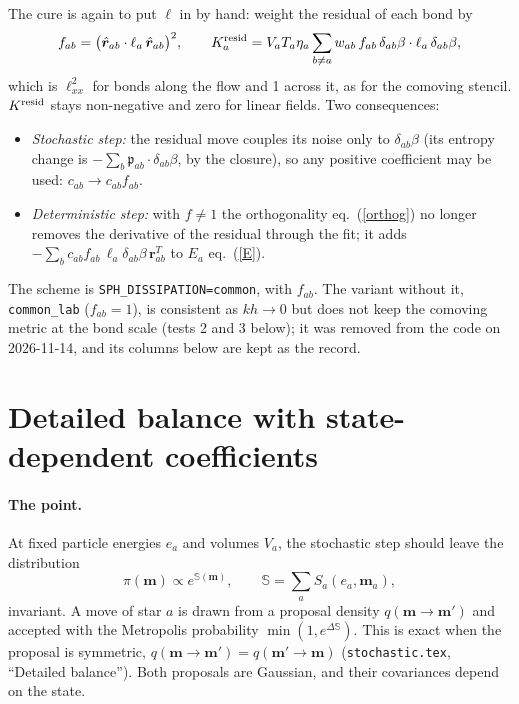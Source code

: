 \documentclass[11pt,aps,preprint,nofootinbib,superscriptaddress,tightenlines]{revtex4-2}
\def\st{\begin{equation}}
\def\stp{\end{equation}}
\def\Eq#1{eq.~(\ref{#1})}
\let\oldparagraph\paragraph
\renewcommand{\paragraph}{\par\bigskip\oldparagraph}
\begin{document}
The cure is again to put $\ell$ in by hand: weight the residual of each bond by
\st
f_{ab}=\big(\hat{\bm r}_{ab}\cdot\ell_a\,\hat{\bm r}_{ab}\big)^2 ,
\qquad K_a^{\rm resid}=V_aT_a\eta_a\sum_{b\neq a}w_{ab}\,f_{ab}\,\delta_{ab}\beta\cdot\ell_a\,\delta_{ab}\beta,
\label{fab}
\stp
which is $\ell_{xx}^2$ for bonds along the flow and 1 across it, as for the comoving stencil.  $K^{\rm resid}$ stays
non-negative and zero for linear fields.  Two consequences:
\begin{itemize}
\item \emph{Stochastic step:} the residual move couples its noise only to $\delta_{ab}\beta$ (its entropy change is
  $-\sum_b\mathfrak p_{ab}\cdot\delta_{ab}\beta$, by the closure), so any positive coefficient may be used: $c_{ab}\to c_{ab}f_{ab}$.
\item \emph{Deterministic step:} with $f\neq1$ the orthogonality \Eq{orthog} no longer removes the derivative of the
  residual through the fit; it adds $-\sum_bc_{ab}f_{ab}\,\ell_a\delta_{ab}\beta\,\bm r_{ab}^T$ to $E_a$ \Eq{E}.
\end{itemize}
The scheme is \texttt{SPH\_DISSIPATION=common}, with $f_{ab}$.  The variant without it, \texttt{common\_lab} ($f_{ab}=1$), is
consistent as $kh\to0$ but does not keep the comoving metric at the bond scale (tests 2 and 3 below); it was removed from the code
on 2026-11-14, and its columns below are kept as the record.

\section{Detailed balance with state-dependent coefficients}
\label{sec:hastings}

\paragraph{The point.}  At fixed particle energies $e_a$ and volumes $V_a$, the stochastic step should leave the distribution
\st
\pi(\bm m)\propto e^{\mathbb S(\bm m)},\qquad \mathbb S=\sum_aS_a(e_a,\bm m_a),
\stp
invariant.  A move of star $a$ is drawn from a proposal density $q(\bm m\to\bm m')$ and accepted with the Metropolis probability
$\min(1,e^{\Delta\mathbb S})$.  This is exact when the proposal is symmetric, $q(\bm m\to\bm m')=q(\bm m'\to\bm m)$
(\texttt{stochastic.tex}, ``Detailed balance'').  Both proposals are Gaussian, and their covariances depend on the state.
\end{document}
